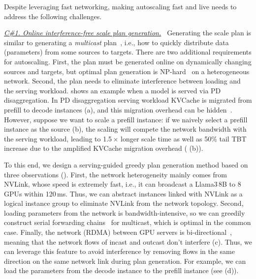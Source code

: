 Despite leveraging fast networking, making autoscaling
fast and live needs to address the following challenges.

\emph{\uline{C\#1. Online interference-free scale plan generation.} \,}
Generating the scale plan is similar to generating a \emph{multicast} plan~\cite{DBLP:journals/jpdc/BhatRP03,DBLP:conf/asplos/CowanMMSX23,DBLP:conf/sc/GhazimirsaeedZR20,DBLP:conf/icpp/BanikazemiMP98,DBLP:conf/dsn/BehrensJBT18},
i.e., how to quickly distribute data (parameters) from some sources to targets.
There are two additional requirements for autoscaling.
First, the plan must be generated online on dynamically changing sources and targets,
but optimal plan generation is NP-hard~\cite{DBLP:journals/jpdc/BhatRP03} on a heterogeneous network.
Second, the plan needs to eliminate interference between loading and the serving workload.
{} shows an example when a model is served via PD disaggregation.
In PD disaggregation serving workload KVCache is migrated from prefill to decode instances (a), 
and this migration overhead can be hidden~\cite{DBLP:conf/isca/PatelCZSGMB24}.
However, suppose we want to scale a prefill instance:
if we naively select a prefill instance as the source (b),
the scaling will compete the network bandwidth with the serving workload,
leading to 1.5\,$\times$ longer scale time as well as 50\% tail TBT increase due to the 
amplified KVCache migration overhead
({} (b)).

To this end,
we design a serving-guided greedy plan generation method
based on three observations (\textsection{\ref{sec:design-plan}}).
First,
the network heterogeneity mainly comes from NVLink,
whose speed is extremely fast,
i.e., it can broadcast a Llama3\,8B to 8 GPUs within 120\,ms.
Thus, we can abstract instances linked with NVLink as a logical instance group
to eliminate NVLink from the network topology.
Second, loading parameters from the network is bandwidth-intensive,
so we can greedily construct serial forwarding chains~\cite{DBLP:conf/icpp/VerstoepLB96}
for multicast, which is optimal in the common case.
Finally, the network (RDMA) between GPU servers is bi-directional~\cite{288657,rdma-bidirectional},
meaning that the network flows of incast and outcast don't interfere (c).
Thus,
we can leverage this feature to avoid interference
by removing flows in the same direction on the same network link during plan generation.
For example, we can load the parameters from the decode instance to the prefill instance (see {} (d)).

